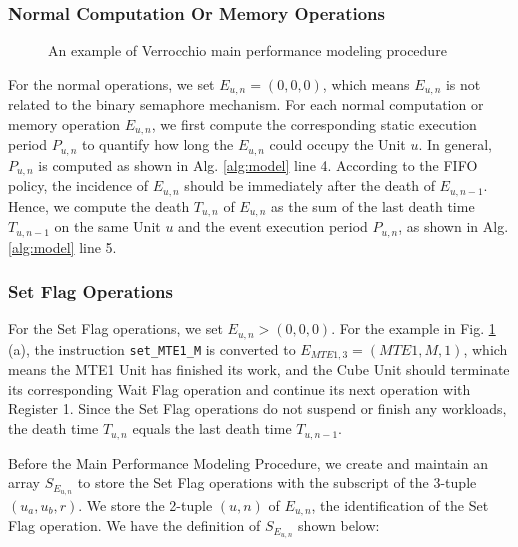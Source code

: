 \subsubsection{Normal Computation Or Memory Operations}

\begin{figure}[tbp]
    \caption{An example of Verrocchio main performance modeling procedure}
    \label{fig:modeling}
\end{figure}

For the normal operations, we set $E_{u, n} = (0, 0, 0)$, which means $E_{u, n}$ is not related to the binary semaphore mechanism. For each normal computation or memory operation $E_{u, n}$, we first compute the corresponding static execution period $P_{u, n}$ to quantify how long the $E_{u, n}$ could occupy the Unit $u$. In general,  $P_{u, n}$ is computed as shown in Alg. \ref{alg:model} line 4. According to the FIFO policy, the incidence of $E_{u, n}$ should be immediately after the death of $E_{u, n-1}$. Hence, we compute the death $T_{u, n}$ of $E_{u, n}$ as the sum of the last death time $T_{u, n-1}$ on the same Unit $u$ and the event execution period $P_{u, n}$, as shown in Alg. \ref{alg:model} line 5.

\subsubsection{Set Flag Operations}

For the Set Flag operations, we set $E_{u, n} > (0, 0, 0)$. For the example in Fig. \ref{fig:modeling} (a), the instruction \verb|set_MTE1_M| is converted to $E_{MTE1, 3} = (MTE1, M, 1)$, which means the MTE1 Unit has finished its work, and the Cube Unit should terminate its corresponding Wait Flag operation and continue its next operation with Register 1. Since the Set Flag operations do not suspend or finish any workloads, the death time $T_{u, n}$ equals the last death time $T_{u, n-1}$.

Before the Main Performance Modeling Procedure, we create and maintain an array $S_{E_{u, n}}$ to store the Set Flag operations with the subscript of the 3-tuple $(u_{a}, u_{b}, r)$. We store the 2-tuple $(u, n)$ of $E_{u, n}$, the identification of the Set Flag operation. We have the definition of $S_{E_{u, n}}$ shown below:


